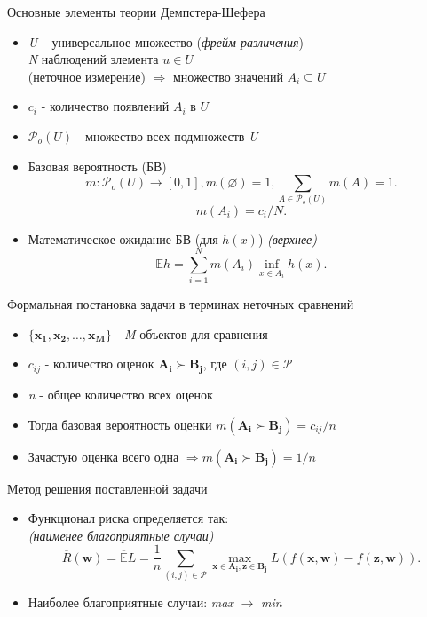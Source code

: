 \documentclass[11pt]{beamer}
\newcommand{\Rho}{%
	\mathcal{P}%
}
\begin{document}
\begin{frame}{Основные элементы теории Демпстера-Шефера}

\begin{itemize}
	\item \emph{U} – универсальное множество (\emph{фрейм различения}) \\
		\emph{N} наблюдений элемента \(u \in U\) \\
		(неточное измерение) \(\Rightarrow\) множество значений \(A_i \subseteq U\)
	\item \(c_i\) - количество появлений \(A_i\) в \(U\)
	\item \(\Rho_o(U)\) - множество всех подмножеств \emph{U}
	\item Базовая вероятность (БВ)
		\[m : \Rho_o(U) \to [0,1], m(\varnothing) = 1, \sum \limits_{A \in \Rho_o(U)} m(A) = 1.\] 
		\[m(A_i) = c_i / N.\]
	\item Математическое ожидание БВ (для \(h(x)\)) \textit{{\footnotesize (верхнее)}}
		\[\mathbb{\overline{E}} h = \sum \limits_{i=1}^N m(A_i) \inf_{x \in A_i} h(x).\]
\end{itemize}

\end{frame}
\begin{frame}{Формальная постановка задачи в терминах неточных сравнений}

\begin{itemize}
	\item \(\{\mathbf{x_1}, \mathbf{x_2}, \dots, \mathbf{x_M}\}\) - \emph{M} объектов для сравнения
	\item \(c_{ij}\) - количество оценок \(\mathbf{A_i} \succ \mathbf{B_j}\), где \((i, j) \in \Rho\)
	\item \emph{n} - общее количество всех оценок
	\item Тогда базовая вероятность оценки \(m(\mathbf{A_i} \succ \mathbf{B_j}) = c_{ij} / n\)
	\item Зачастую оценка всего одна \(\Rightarrow m(\mathbf{A_i} \succ \mathbf{B_j}) = 1 / n\)
\end{itemize}

\end{frame}
\begin{frame}{Метод решения поставленной задачи}

\begin{itemize}
	\item Функционал риска определяется так:\\
		\textit{{\footnotesize (наименее благоприятные случаи)}}
	\[\overline{R}(\mathbf{w}) = \mathbb{\overline{E}}L = \frac{1}{n} \sum \limits_{(i,j) \in \Rho} \underset{\mathbf{x} \in \mathbf{A_i}, \mathbf{z} \in \mathbf{B_j}}{\operatorname{max}}L(f(\mathbf{x}, \mathbf{w}) - f(\mathbf{z}, \mathbf{w})).\]
	\item Наиболее благоприятные случаи: \emph{max} \(\rightarrow\) \emph{min}
\end{itemize}

\end{frame}
\end{document}
